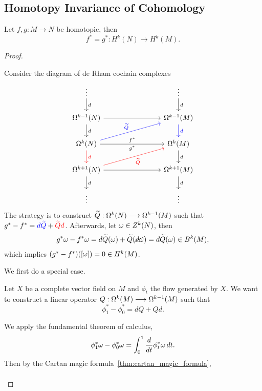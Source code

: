 \subsection*{Homotopy Invariance of Cohomology}
\begin{theorem}
    Let \(f,g:M\longrightarrow N\) be homotopic, then \[
        f^* = g^*:H^k(N)\longrightarrow H^k(M).
    \]
\end{theorem}
\begin{proof}
    \begin{roof}
        Consider the diagram of de Rham cochain complexes \[
            \begin{tikzcd}[column sep=8em]
                \vdots \ar{d}{d} & \vdots \ar{d}{d} \\
                \Omg^{k-1}(N) \ar{r} \ar{d}{d} & \Omg^{k-1}(M) \ar[blue]{d}{d} \\
                \Omg^k(N) \ar{r}{f^*}[']{g^*} \ar[blue]{ur}{\wt{Q}} \ar[red]{d}{d} & \Omg^k(M) \ar{d}{d} \\
                \Omg^{k+1}(N) \ar{r} \ar[red]{ur}[']{\wt{Q}} \ar{d}{d} & \Omg^{k+1}(M) \ar{d}{d} \\
                \vdots & \vdots
            \end{tikzcd}
        \]
        The strategy is to construct \(\widetilde{Q}:\Omega^k(N)\longrightarrow\Omega^{k-1}(M)\) such that \(g^* - f^* = \textcolor{blue}{d\widetilde{Q}} + \textcolor{red}{\widetilde{Q}d}\).
        Afterwards, let \(\omega\in Z^k(N)\), then \begin{align*}
            g^*\omega - f^*\omega
            = d\widetilde{Q}(\omega) + \widetilde{Q}(\cancel{d\omega}) = d\widetilde{Q}(\omega)\in B^k(M),
        \end{align*} which implies \((g^* - f^*)([\omega]) = 0\in H^k(M)\).
    \end{roof}
    We first do a special case.
    \begin{roof}
        Let \(X\) be a complete vector field on \(M\) and \(\phi_t\) the flow generated by \(X\). We want to construct a linear operator \(
            Q:\Omega^k(M)\longrightarrow\Omega^{k-1}(M)
        \) such that \[
            \phi_1^* - \phi_0^* = dQ + Qd.
        \]
        \begin{roof}
            We apply the fundamental theorem of calculus, \begin{align*}
                \phi_1^*\omega - \phi_0^*\omega
                = \int_0^1 \frac{d}{dt}\phi_t^*\omega\,dt.
            \end{align*}
            Then by the Cartan magic formula~\ref{thm:cartan_magic_formula}, \begin{align*}

\end{align*}
\end{roof}
\end{roof}
\end{proof}

